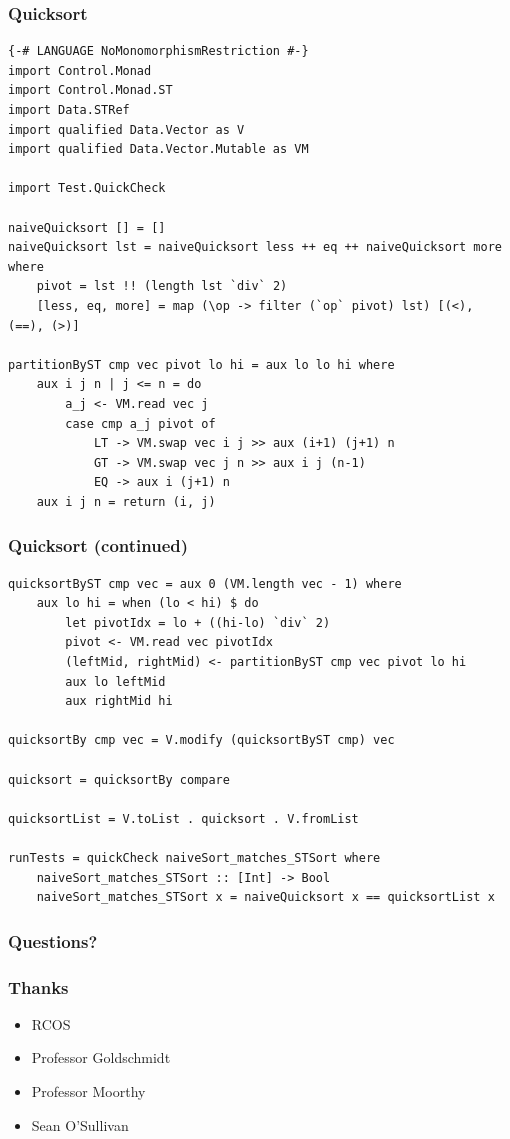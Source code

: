 \documentclass{beamer}
\begin{document}
\begin{frame}[fragile]
\frametitle{Quicksort}
\begin{Verbatim}[frame=single, fontsize=\scriptsize]
{-# LANGUAGE NoMonomorphismRestriction #-}
import Control.Monad
import Control.Monad.ST
import Data.STRef
import qualified Data.Vector as V
import qualified Data.Vector.Mutable as VM

import Test.QuickCheck

naiveQuicksort [] = []
naiveQuicksort lst = naiveQuicksort less ++ eq ++ naiveQuicksort more where
    pivot = lst !! (length lst `div` 2)
    [less, eq, more] = map (\op -> filter (`op` pivot) lst) [(<), (==), (>)]

partitionByST cmp vec pivot lo hi = aux lo lo hi where
    aux i j n | j <= n = do 
        a_j <- VM.read vec j 
        case cmp a_j pivot of
            LT -> VM.swap vec i j >> aux (i+1) (j+1) n
            GT -> VM.swap vec j n >> aux i j (n-1)
            EQ -> aux i (j+1) n
    aux i j n = return (i, j)
\end{Verbatim}
\end{frame}

\begin{frame}[fragile]
\frametitle{Quicksort (continued)}
\begin{Verbatim}[frame=single, fontsize=\scriptsize]
quicksortByST cmp vec = aux 0 (VM.length vec - 1) where
    aux lo hi = when (lo < hi) $ do
        let pivotIdx = lo + ((hi-lo) `div` 2)
        pivot <- VM.read vec pivotIdx
        (leftMid, rightMid) <- partitionByST cmp vec pivot lo hi
        aux lo leftMid 
        aux rightMid hi

quicksortBy cmp vec = V.modify (quicksortByST cmp) vec

quicksort = quicksortBy compare

quicksortList = V.toList . quicksort . V.fromList

runTests = quickCheck naiveSort_matches_STSort where
    naiveSort_matches_STSort :: [Int] -> Bool
    naiveSort_matches_STSort x = naiveQuicksort x == quicksortList x
\end{Verbatim}
\end{frame}

\begin{frame}[fragile]
\frametitle{Questions?}
\end{frame}

\begin{frame}[fragile]
\frametitle{Thanks}
\begin{itemize}
\item RCOS
\item Professor Goldschmidt
\item Professor Moorthy
\item Sean O'Sullivan
\end{itemize}
\end{frame}
\end{document}
